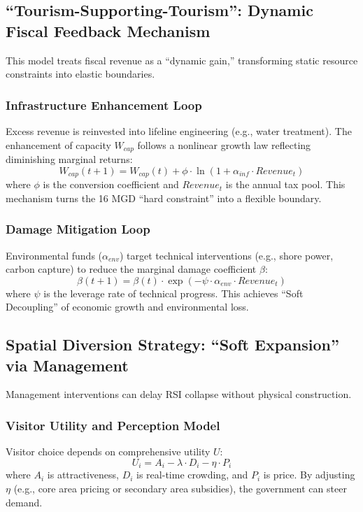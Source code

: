 \documentclass{mcmthesis}
\begin{document}
\subsection{``Tourism-Supporting-Tourism'': Dynamic Fiscal Feedback Mechanism}
This model treats fiscal revenue as a ``dynamic gain,'' transforming static resource constraints into elastic boundaries.

\subsubsection{Infrastructure Enhancement Loop}
Excess revenue is reinvested into lifeline engineering (e.g., water treatment). The enhancement of capacity $W_{cap}$ follows a nonlinear growth law reflecting diminishing marginal returns:
\begin{equation}
W_{cap}(t+1) = W_{cap}(t) + \phi \cdot \ln(1 + \alpha_{inf} \cdot Revenue_t)
\end{equation}
where $\phi$ is the conversion coefficient and $Revenue_t$ is the annual tax pool. This mechanism turns the 16 MGD ``hard constraint'' into a flexible boundary.

\subsubsection{Damage Mitigation Loop}
Environmental funds ($\alpha_{env}$) target technical interventions (e.g., shore power, carbon capture) to reduce the marginal damage coefficient $\beta$:
\begin{equation}
\beta(t+1) = \beta(t) \cdot \exp(-\psi \cdot \alpha_{env} \cdot Revenue_t)
\end{equation}
where $\psi$ is the leverage rate of technical progress. This achieves ``Soft Decoupling'' of economic growth and environmental loss.

\subsection{Spatial Diversion Strategy: ``Soft Expansion'' via Management}
Management interventions can delay RSI collapse without physical construction.

\subsubsection{Visitor Utility and Perception Model}
Visitor choice depends on comprehensive utility $U$:
\begin{equation}
U_i = A_i - \lambda \cdot D_i - \eta \cdot P_i
\end{equation}
where $A_i$ is attractiveness, $D_i$ is real-time crowding, and $P_i$ is price. By adjusting $\eta$ (e.g., core area pricing or secondary area subsidies), the government can steer demand.
\end{document}
